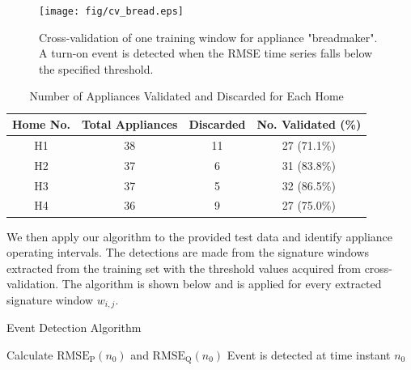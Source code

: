 \documentclass[conference]{IEEEtran}
\begin{document}
\begin{figure}[!t]
	\centering
	\texttt{[image: fig/cv\_bread.eps]}
	\caption{Cross-validation of one training window for appliance "breadmaker". A turn-on event is detected when the RMSE time series falls below the specified threshold. }
	\label{fig:bread}
\end{figure}

\begin{table}[!t]
	\renewcommand{\arraystretch}{1.3}
	\caption{Number of Appliances Validated and Discarded for Each Home}\label{classes}
	\label{table:cv}
	\centering
	\begin{tabular}{c||c||c||c}
		\hline 
		\textbf{Home No.} & \textbf{Total Appliances} &\textbf{Discarded} &\textbf{No. Validated (\%)}\tabularnewline
		\hline 
		\hline 
		H1 & 38 & 11 & 27 (71.1\%)\tabularnewline
		\hline 
		H2 & 37 & 6 & 31 (83.8\%)\tabularnewline
		\hline 
		H3 & 37 & 5 & 32 (86.5\%)\tabularnewline
		\hline 
		H4 & 36 & 9 & 27 (75.0\%)\tabularnewline
		\hline 
	\end{tabular}
\end{table}


We then apply our algorithm to the provided test data and identify appliance operating intervals.  The detections are made from the signature windows extracted from the training set with the threshold values acquired from cross-validation.  The algorithm is shown below and is applied for every extracted signature window $w_{i,j}$.

\begin{algorithm}
	\caption{Event Detection Algorithm}\label{euclid}
	\begin{algorithmic}[1]
			\State Calculate $\text{RMSE}_{\text{P}}(n_0)$ and $\text{RMSE}_{\text{Q}}(n_0)$
			\State Event is detected at time instant $n_0$
			\EndIf
	\EndFor
	\end{algorithmic}
\end{algorithm}
\end{document}
